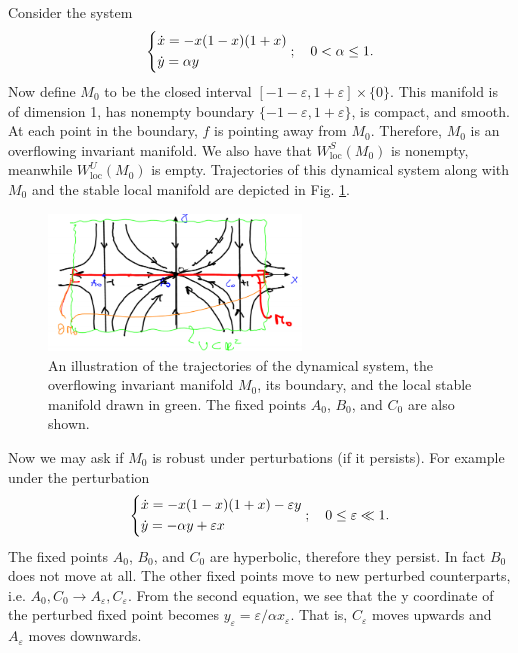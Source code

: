 \begin{ex}[]
	Consider the system
	\begin{align}
		\begin{dcases}
			\dot{x}= -x(1-x)(1+x) \\
			\dot{y} = \alpha y
		\end{dcases}
		;\quad 0 < \alpha \leq 1.
	\end{align}
	Now define $M_0$ to be the closed interval $[-1-\varepsilon, 1 + \varepsilon]\times \{0\}$. This manifold is of dimension 1, has nonempty boundary $\{-1-\varepsilon, 1+\varepsilon\}$, is compact, and smooth. At each point in the boundary, $f$ is pointing away from $M_0$. Therefore, $M_0$ is an overflowing invariant manifold. We also have that $W^{S}_{ \textrm{loc}}(M_0)$ is nonempty, meanwhile $W^{U}_{ \textrm{loc} }(M_0)$ is empty. Trajectories of this dynamical system along with $M_0$ and the stable local manifold are depicted in Fig. \ref{fig:overflowing_mfd_ex1}.
	\begin{figure}[h!]
		\centering
		\includegraphics[width=0.6\textwidth]{figures/ch9/11overflowing_mfd_ex1.png}
		\caption{An illustration of the trajectories of the dynamical system, the overflowing invariant manifold $M_0$, its boundary, and the local stable manifold drawn in green. The fixed points $A_0$, $B_0$, and $C_0$ are also shown.}
		\label{fig:overflowing_mfd_ex1}
	\end{figure}

	Now we may ask if $M_0$ is robust under perturbations (if it persists). For example under the perturbation
	\begin{align}
		\begin{dcases}
			\dot{x} = -x(1-x)(1+x) -\varepsilon y \\
			\dot{y} = - \alpha y + \varepsilon x
		\end{dcases}
		;\quad 0 \leq \varepsilon \ll 1.
	\end{align}
	The fixed points $A_0$, $B_0$, and $C_0$ are hyperbolic, therefore they persist. In fact $B_0$ does not move at all. The other fixed points move to new perturbed counterparts, i.e. $A_0,C_0 \to A_{\varepsilon}, C_{\varepsilon}$. From the second equation, we see that the y coordinate of the perturbed fixed point becomes $y_\varepsilon= \varepsilon/\alpha x_\varepsilon$. That is, $C_\varepsilon$ moves upwards and $A_\varepsilon$ moves downwards.


\end{ex}
